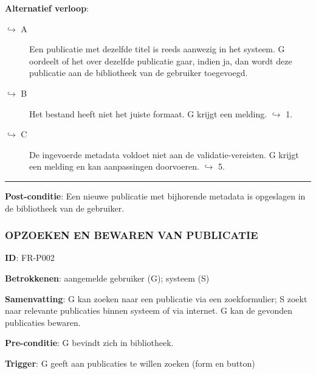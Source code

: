 \noindent \textbf{Alternatief verloop}:
\begin{description}
\item[ $\hookrightarrow$ A] Een publicatie met dezelfde titel is reeds aanwezig in het systeem. G oordeelt of het over dezelfde publicatie gaar, indien ja, dan wordt deze publicatie aan de bibliotheek van de gebruiker toegevoegd. 
\item[ $\hookrightarrow$ B] Het bestand heeft niet het juiste formaat. G krijgt een melding. $\hookrightarrow$ 1.
\item[ $\hookrightarrow$ C] De ingevoerde metadata voldoet niet aan de validatie-vereisten. G krijgt een melding en kan aanpassingen doorvoeren. $\hookrightarrow$ 5.
\end{description}

\vspace{2 mm}
\hrule
\vspace{4 mm}


\noindent \textbf{Post-conditie}: Een nieuwe publicatie met bijhorende metadata is opgeslagen in  de bibliotheek van de gebruiker. \\



\subsubsection{OPZOEKEN EN BEWAREN VAN PUBLICATIE}
\vspace{2 mm}

\textbf{ID}: FR-P002
\vspace{2 mm}

\noindent \textbf{Betrokkenen}: aangemelde gebruiker (G); systeem (S) 
\vspace{2 mm}

\noindent \textbf{Samenvatting}: G kan zoeken naar een publicatie via een zoekformulier; S zoekt naar relevante publicaties binnen systeem of via internet. G kan de gevonden publicaties bewaren. 
\vspace{2 mm}

\noindent \textbf{Pre-conditie}: G bevindt zich in bibliotheek. 
\vspace{2 mm}

\noindent \textbf{Trigger}: G geeft aan publicaties te willen zoeken (form en button)
\vspace{4 mm}

